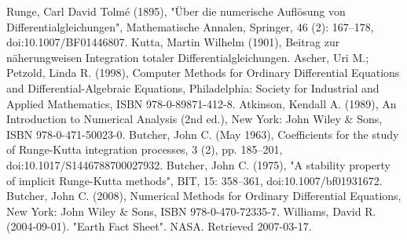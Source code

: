 \documentclass[twoside,twocolumn]{article}
\begin{document}
\begin{CJK*}{UTF8}{gkai}
\newpage
\renewcommand\refname{参考文献}
\begin{thebibliography}{99}
Runge, Carl David Tolmé (1895), "Über die numerische Auflösung von Differentialgleichungen", Mathematische Annalen, Springer, 46 (2): 167–178, doi:10.1007/BF01446807.
Kutta, Martin Wilhelm (1901), Beitrag zur näherungweisen Integration totaler Differentialgleichungen.
Ascher, Uri M.; Petzold, Linda R. (1998), Computer Methods for Ordinary Differential Equations and Differential-Algebraic Equations, Philadelphia: Society for Industrial and Applied Mathematics, ISBN 978-0-89871-412-8.
Atkinson, Kendall A. (1989), An Introduction to Numerical Analysis (2nd ed.), New York: John Wiley \& Sons, ISBN 978-0-471-50023-0.
Butcher, John C. (May 1963), Coefficients for the study of Runge-Kutta integration processes, 3 (2), pp. 185–201, doi:10.1017/S1446788700027932.
Butcher, John C. (1975), "A stability property of implicit Runge-Kutta methods", BIT, 15: 358–361, doi:10.1007/bf01931672.
Butcher, John C. (2008), Numerical Methods for Ordinary Differential Equations, New York: John Wiley \& Sons, ISBN 978-0-470-72335-7.
Williams, David R. (2004-09-01). "Earth Fact Sheet". NASA. Retrieved 2007-03-17.
\end{thebibliography} 

\end{CJK*}
\end{document}
